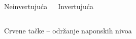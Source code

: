 \begin{frame}[label=08-s018]
\centering
\begin{columns}[T,onlytextwidth]\centering Neinvertujuća\par\medskip
{}\centering Invertujuća\par\medskip\end{columns}\bigskip
Crvene tačke – održanje naponskih nivoa
\end{frame}
